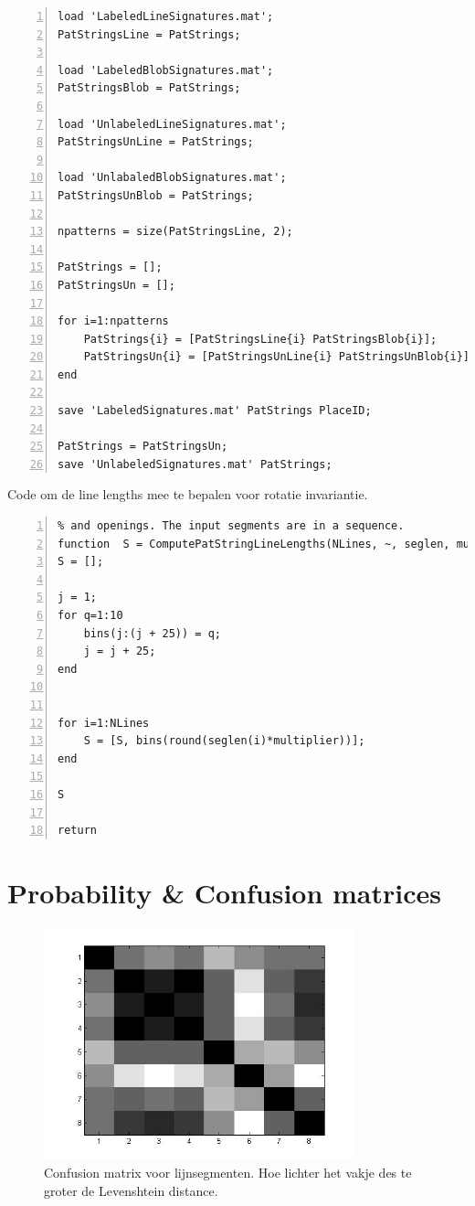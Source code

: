 \documentclass[a4paper]{article}
\begin{document}
\begin{lstlisting}[caption= CombineSignatures.m, label=lst:checkconcat, numbers=left]
load 'LabeledLineSignatures.mat';
PatStringsLine = PatStrings;

load 'LabeledBlobSignatures.mat';
PatStringsBlob = PatStrings;

load 'UnlabeledLineSignatures.mat';
PatStringsUnLine = PatStrings;

load 'UnlabaledBlobSignatures.mat';
PatStringsUnBlob = PatStrings;

npatterns = size(PatStringsLine, 2);

PatStrings = [];
PatStringsUn = [];

for i=1:npatterns
    PatStrings{i} = [PatStringsLine{i} PatStringsBlob{i}];
    PatStringsUn{i} = [PatStringsUnLine{i} PatStringsUnBlob{i}];
end

save 'LabeledSignatures.mat' PatStrings PlaceID;

PatStrings = PatStringsUn;
save 'UnlabeledSignatures.mat' PatStrings;

\end{lstlisting}
Code om de line lengths mee te bepalen voor rotatie invariantie.
\begin{lstlisting}[caption= ComputePatStringLineLengths.m, label=lst:checkconcat, numbers=left]
% this function computes the pattern string based on the extracted segments
% and openings. The input segments are in a sequence. 
function  S = ComputePatStringLineLengths(NLines, ~, seglen, multiplier)
S = [];

j = 1;
for q=1:10
    bins(j:(j + 25)) = q;
    j = j + 25;
end


for i=1:NLines
    S = [S, bins(round(seglen(i)*multiplier))];
end

S

return
\end{lstlisting}


\section{Probability \& Confusion matrices}

\begin{figure}[h]
	\centering
	\includegraphics[width=0.8\textwidth]{confusion_line.jpg}
	\caption{Confusion matrix voor lijnsegmenten. Hoe lichter het vakje des te groter de Levenshtein distance.}
	\label{fig:confusion_line}
\end{figure}
\end{document}
